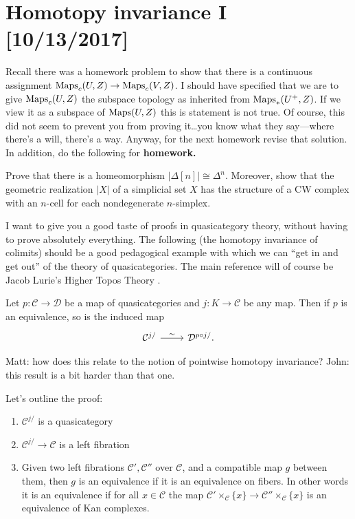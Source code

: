 \documentclass{amsart}
\begin{document}
\newpage

\section{Homotopy invariance I [10/13/2017]}

Recall there was a homework problem to show that there is a continuous assignment $\operatorname{Maps}_c(U,Z)\to\operatorname{Maps}_c(V,Z)$.
I should have specified that we are to give $\operatorname{Maps}_c(U,Z)$ the subspace topology as inherited from $\operatorname{Maps}_*(U^+,Z)$.
If we view it as a subspace of $\operatorname{Maps}(U,Z)$ this is statement is not true.
Of course, this did not seem to prevent you from proving it\ldots you know what they say---where there's
a will, there's a way.
Anyway, for the next homework revise that solution.
In addition, do the following for \textbf{homework.}

\begin{exercise}
    Prove that there is a homeomorphism $|\Delta[n]|\cong\Delta^n$. Moreover, show that
    the geometric realization $|X|$ of a simplicial set $X$ has the structure of a CW
    complex with an $n$-cell for each nondegenerate $n$-simplex.
\end{exercise}

I want to give you a good taste of proofs in quasicategory theory, without having
to prove absolutely everything. The following (the homotopy invariance of colimits)
should be a good pedagogical example
with which we can ``get in and get out'' of the theory of quasicategories. The main
reference will of course be Jacob Lurie's Higher Topos Theory \cite{lurie}.
\begin{proposition}
    Let $p:\mathcal{C}\to\mathcal{D}$ be a map of quasicategories and $j:K\to\mathcal{C}$
    be any map. Then if $p$ is an equivalence, so is the induced map
    \begin{equation*}
        \begin{tikzcd}
            \mathcal{C}^{j/} \rar{\sim} & \mathcal{D}^{p\circ j/}.
        \end{tikzcd}
    \end{equation*}
\end{proposition}
Matt: how does this relate to the notion of pointwise homotopy invariance?
John: this result is a bit harder than that one.

Let's outline the proof:
\begin{enumerate}
    \item $\mathcal{C}^{j/}$ is a quasicategory
    \item $\mathcal{C}^{j/}\to\mathcal{C}$ is a left fibration
    \item Given two left fibrations $\mathcal{C}', \mathcal{C}''$ over $\mathcal{C}$, 
        and a compatible map $g$ between them, then $g$ is an equivalence if it is
        an equivalence on fibers. In other words it is an equivalence if for all $x\in \mathcal{C}$
        the map $\mathcal{C}'\times_{\mathcal{C}}\{x\} \to \mathcal{C}''\times_\mathcal{C}\{x\}$ is
        an equivalence of Kan complexes.
\end{enumerate}
\end{document}
